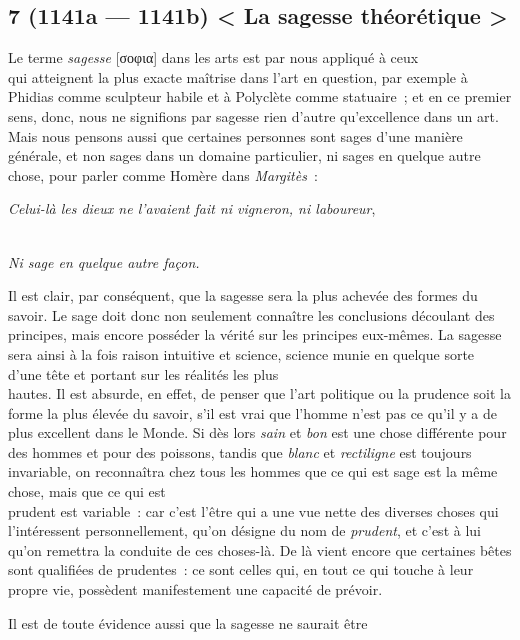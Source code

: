 \documentclass[french,twoside]{book} %
\begin{document}
\subsection[{7 (1141a — 1141b) < La sagesse théorétique >}]{7 (1141a — 1141b) < La sagesse théorétique >}
\noindent Le terme {\itshape sagesse} [σοφια] dans les arts est par nous appliqué à ceux \\
qui atteignent la plus exacte maîtrise dans l’art en question, par exemple à Phidias comme sculpteur habile et à Polyclète comme statuaire ; et en ce premier sens, donc, nous ne signifions par sagesse rien d’autre qu’excellence dans un art. Mais nous pensons aussi que certaines personnes sont sages d’une manière générale, et non sages dans un domaine particulier, ni sages en quelque autre chose, pour parler comme Homère dans {\itshape Margitès} :\par
{\itshape Celui-là les dieux ne l’avaient fait ni vigneron, ni laboureur}, \par
 \\
 {\itshape Ni sage en quelque autre façon.} \par
Il est clair, par conséquent, que la sagesse sera la plus achevée des formes du savoir. Le sage doit donc non seulement connaître les conclusions découlant des principes, mais encore posséder la vérité sur les principes eux-mêmes. La sagesse sera ainsi à la fois raison intuitive et science, science munie en quelque sorte d’une tête et portant sur les réalités les plus \\
hautes. Il est absurde, en effet, de penser que l’art politique ou la prudence soit la forme la plus élevée du savoir, s’il est vrai que l’homme n’est pas ce qu’il y a de plus excellent dans le Monde. Si dès lors {\itshape sain} et {\itshape bon} est une chose différente pour des hommes et pour des poissons, tandis que {\itshape blanc} et {\itshape rectiligne} est toujours invariable, on reconnaîtra chez tous les hommes que ce qui est sage est la même chose, mais que ce qui est \\
prudent est variable : car c’est l’être qui a une vue nette des diverses choses qui l’intéressent personnellement, qu’on désigne du nom de {\itshape prudent}, et c’est à lui qu’on remettra la conduite de ces choses-là. De là vient encore que certaines bêtes sont qualifiées de prudentes : ce sont celles qui, en tout ce qui touche à leur propre vie, possèdent manifestement une capacité de prévoir.\par
Il est de toute évidence aussi que la sagesse ne saurait être \\
\end{document}
